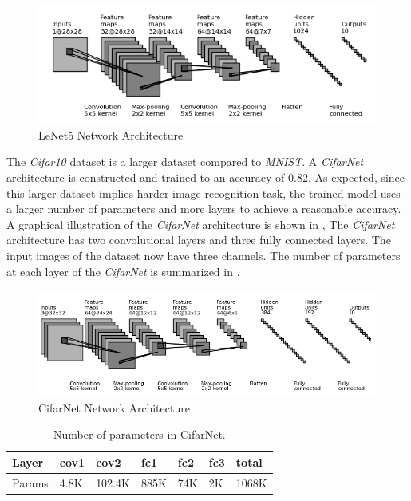 \documentclass[a4paper,12pt]{report}
\begin{document}
\begin{figure}[!h]
  \includegraphics[width=\textwidth]{fig_mnist.png}
  \caption{LeNet5 Network Architecture}
  \label{fig:lenet5_arch}
\end{figure}

The \textit{Cifar10} dataset is a larger dataset compared to \textit{MNIST}.
A \textit{CifarNet} architecture is constructed and trained to an accuracy of $0.82$.
As expected, since this larger dataset implies harder image recognition task,
the trained model uses a larger number of parameters and more layers
to achieve a reasonable accuracy.
A graphical illustration of the \textit{CifarNet} architecture is shown in ,
The \textit{CifarNet} architecture has two convolutional layers and three fully connected
layers.
The input images of the dataset now have three channels.
The number of parameters at each layer of the \textit{CifarNet} is summarized
in .

\begin{figure}[!h]
  \includegraphics[width=\textwidth]{fig_cifarnet.png}
  \caption{CifarNet Network Architecture}
  \label{fig:Cifarnetparam}
\end{figure}

\begin{table}[!h]
\centering
\begin{tabular}{|l|l|l|l|l|l|l|}
\hline
Layer			&cov1	&cov2	&fc1	&fc2	&fc3 		&total\\ \hline
Params		& 4.8K		&102.4K	&885K	&74K	&2K &1068K\\
\hline
\end{tabular}
\caption{\label{tab:CifarNetparam}Number of parameters in CifarNet.}
\end{table}
\end{document}
